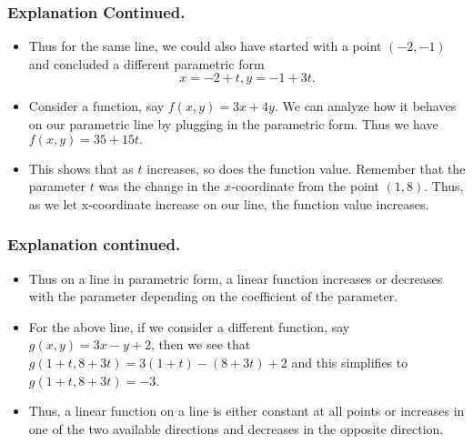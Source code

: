 
\begin{frame}%
  \frametitle{Explanation Continued.}
  \begin{itemize}%
\item
Thus for the same line, we could also have started with a point
$(-2,-1)$ and concluded a different parametric form
$$x=-2+t, y=-1+3t.$$  
\item
{}
Consider a function, say $f(x,y)=3x+4y$.
We can analyze how it behaves on our parametric line by plugging
in the parametric form. Thus we have $f(x,y)=35+15t.$
\item This shows that as $t$ increases, so does the function value.
Remember that the parameter $t$ was the change in the $x$-coordinate
from the point $(1,8)$. 
Thus, as we let x-coordinate increase on our line, the
function value increases.
\end{itemize}
\end{frame}

\begin{frame}%
  \frametitle{Explanation continued.}
  \begin{itemize}%
\item
{}
Thus on a line in parametric form, a linear function
increases or decreases with the parameter depending on
the coefficient of the parameter.
  
\item
For the above line, if we consider a different function,
say $g(x,y)=3x-y+2$, then we see that 
$g(1+t,8+3t) = 3(1+t) -(8+3t)+2$ and  this simplifies to 
$g(1+t,8+3t) = -3$.
\item
Thus, a linear function on a line is either constant
at all points or increases in one of the two available
directions and decreases in the opposite direction.

\end{itemize}
\end{frame}



